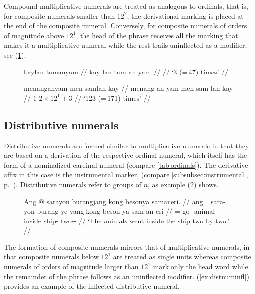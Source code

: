 Compound multiplicative numerals are treated as analogous to ordinals, that is,
for composite numerals smaller than $12^2$, the derivational marking is placed
at the end of the composite numeral. Conversely, for composite numerals of
orders of magnitude above $12^1$, the head of the phrase receives all the
marking that makes it a multiplicative numeral while the rest trails
uninflected as a modifier; see (\ref{ex:mutlnuminfl}).

\begin{figure}[h]
\pex\label{ex:mutlnuminfl}
\a\begingl
	\gla kaylan-tamanyam //
	\glb kay-lan-tam-an-yam //
	 //
	\glft `3\elv{} (=\,47) times' //
\endgl

\a\begingl
	\gla menanganyam men samlan-kay //
	\glb menang-an-yam men sam-lan-kay //
	 {$1$} {$2 \times 12^1 + 3$} //
	\glft `123 (=\,171) times' //
\endgl
\xe
\end{figure}


\subsection{Distributive numerals}

Distributive numerals are formed similar to multiplicative numerals in that
they are based on a derivation of the respective ordinal numeral, which itself
has the form of a nominalized cardinal numeral (compare
\autoref{tab:ordinals}). The derivative affix in this case is the instrumental
marker,  (compare \autoref{subsubsec:instrumental},
p.~\pageref{subsubsec:instrumental}).
Distributive numerals refer to groups of $n$, as example (\ref{ex:distnum})
shows.

\begin{figure}[h]
\ex\label{ex:distnum}
\begingl
	\gla Ang @ sarayon burangjang kong besonya samaneri. //
	\glb ang= sara-yon burang-ye-yang kong beson-ya sam-an-eri //
	\glc \AgtT{}= go-\TplN{} animal-\Pl{}-\Aarg{} inside ship-\Loc{} 
		two-\Nmlz{}-\Ins{} //
	\glft `The animals went inside the ship two by two.' //
\endgl
\xe
\end{figure}

The formation of composite numerals mirrors that of multiplicative
numerals, in that composite numerals below $12^1$ are treated as single units
whereas composite numerals of orders of magnitude larger than $12^1$ mark only
the head word while the remainder of the phrase follows as an uninflected
modifier. (\ref{ex:distnuminfl}) provides an example of the inflected
distributive numeral.

